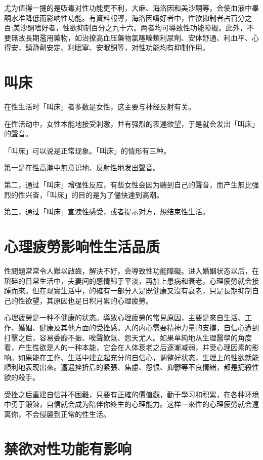 \documentclass[12pt,UTF8]{ctexbook}
\begin{document}
尤为值得一提的是吸毒对性功能更不利，大麻、海洛因和美沙酮等，会使血液中睾酮水准降低而影响性功能。有資料報導，海洛因嗜好者中，性欲抑制者占百分之百;美沙酮嗜好者，性欲抑制百分之九十六。两者均可導致性功能障礙。此外，不要無故長期濫用藥物，如治撩高血压藥物氯噻嗪類利尿劑、安体舒通、利血平、心得安，鎮静劑安定、利眠寧、安眠酮等，对性功能均有抑制作用。

\section{叫床}

在性生活时「叫床」者多数是女性，这主要与神经反射有关。

在性活动中，女性本能地接受刺激，并有强烈的表達欲望，于是就会发出「叫床」的聲音。

「叫床」可以说是正常现象。「叫床」的情形有三种。

第一是在性高潮中無意识地、反射性地发出聲音。

第二，通过「叫床」增强性反应，有些女性会因为聽到自己的聲音，而产生無比强烈的性兴奋，「叫床」的目的是为了儘快達到高潮。

第三，通过「叫床」宣洩性感受，或者提示对方，想结束性生活。

\section{心理疲勞影响性生活品质}

性問題常常令人難以啟齒，解決不好，会導致性功能障礙。进入婚姻状态以后，在瑣碎的日常生活中，夫妻间的感情歸于平淡，再加上患病和衰老，心理疲勞就会接踵而來。但在现實生活中，的確有一部分人是既健康又沒有衰老，只是長期抑制自己的性欲望，其原因也是日积月累的心理疲勞。

心理疲勞是一种不健康的状态。導致心理疲勞的常見原因，主要是來自生活、工作、婚姻、健康及其他方面的受挫感。人的内心需要精神力量的支撐，自信心遭到打擊之后，容易委靡不振、唉聲歎氣、怨天尤人。如果单純地从生理醫學的角度看，产生性欲是人的一种本能，它会在人体衰老之后逐漸减弱，并受心理因素的影响。如果能在工作、生活中建立起充分的自信心，调整好状态，生理上的性欲就能順利地表现出來。遭遇挫折后的紧張、焦慮、怨恨、抑鬱等不良情緒，都是扼殺性欲的殺手。

受挫之后重建自信并不困難，只要有正確的價值觀，勤于學习和积累，在各种环境中勇于鍛鍊，自信就会成为陪伴你終生的心理能力。这样一來性的心理疲勞就会遠离你，不会侵襲到正常的性生活。

\section{禁欲对性功能有影响}
\end{document}
